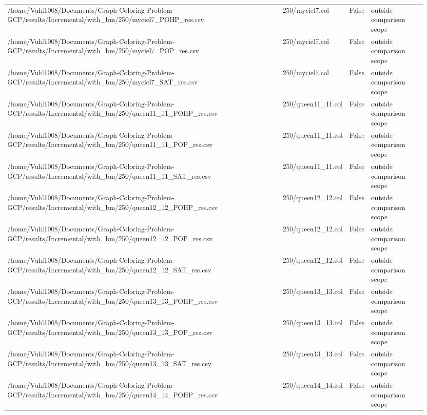 \begin{table}[htbp]
\begin{tabular}{llll}
/home/Vuhl1008/Documents/Graph-Coloring-Problem-GCP/results/Incremental/with\_bm/250/myciel7\_POHP\_res.csv & 250/myciel7.col & False & outside comparison scope \\
/home/Vuhl1008/Documents/Graph-Coloring-Problem-GCP/results/Incremental/with\_bm/250/myciel7\_POP\_res.csv & 250/myciel7.col & False & outside comparison scope \\
/home/Vuhl1008/Documents/Graph-Coloring-Problem-GCP/results/Incremental/with\_bm/250/myciel7\_SAT\_res.csv & 250/myciel7.col & False & outside comparison scope \\
/home/Vuhl1008/Documents/Graph-Coloring-Problem-GCP/results/Incremental/with\_bm/250/queen11\_11\_POHP\_res.csv & 250/queen11\_11.col & False & outside comparison scope \\
/home/Vuhl1008/Documents/Graph-Coloring-Problem-GCP/results/Incremental/with\_bm/250/queen11\_11\_POP\_res.csv & 250/queen11\_11.col & False & outside comparison scope \\
/home/Vuhl1008/Documents/Graph-Coloring-Problem-GCP/results/Incremental/with\_bm/250/queen11\_11\_SAT\_res.csv & 250/queen11\_11.col & False & outside comparison scope \\
/home/Vuhl1008/Documents/Graph-Coloring-Problem-GCP/results/Incremental/with\_bm/250/queen12\_12\_POHP\_res.csv & 250/queen12\_12.col & False & outside comparison scope \\
/home/Vuhl1008/Documents/Graph-Coloring-Problem-GCP/results/Incremental/with\_bm/250/queen12\_12\_POP\_res.csv & 250/queen12\_12.col & False & outside comparison scope \\
/home/Vuhl1008/Documents/Graph-Coloring-Problem-GCP/results/Incremental/with\_bm/250/queen12\_12\_SAT\_res.csv & 250/queen12\_12.col & False & outside comparison scope \\
/home/Vuhl1008/Documents/Graph-Coloring-Problem-GCP/results/Incremental/with\_bm/250/queen13\_13\_POHP\_res.csv & 250/queen13\_13.col & False & outside comparison scope \\
/home/Vuhl1008/Documents/Graph-Coloring-Problem-GCP/results/Incremental/with\_bm/250/queen13\_13\_POP\_res.csv & 250/queen13\_13.col & False & outside comparison scope \\
/home/Vuhl1008/Documents/Graph-Coloring-Problem-GCP/results/Incremental/with\_bm/250/queen13\_13\_SAT\_res.csv & 250/queen13\_13.col & False & outside comparison scope \\
/home/Vuhl1008/Documents/Graph-Coloring-Problem-GCP/results/Incremental/with\_bm/250/queen14\_14\_POHP\_res.csv & 250/queen14\_14.col & False & outside comparison scope \\

\end{tabular}
\end{table}
